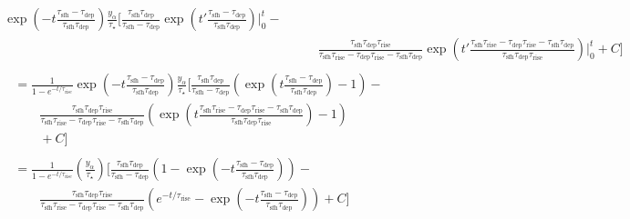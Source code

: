 \documentclass[12pt]{article}
\newcommand{\timescale}[1]{\ensuremath{\tau_\text{#1}}}
\begin{document}
\begin{subequations}
\begin{align}
\begin{split}
\exp \left(-t\frac{
	\timescale{sfh} - \timescale{dep}
}{
	\timescale{sfh}\timescale{dep}
}\right) \frac{y_\alpha}{\tau_\star} \bigg[\frac{
	\timescale{sfh}\timescale{dep}
}{
	\timescale{sfh} - \timescale{dep}
} \exp \left(t' \frac{
	\timescale{sfh} - \timescale{dep}
}{
	\timescale{sfh}\timescale{dep}
}\right) \bigg|_0^t -
\\
&\qquad \frac{
	\timescale{sfh}\timescale{dep}\timescale{rise}
}{
	\timescale{sfh}\timescale{rise} - \timescale{dep}\timescale{rise} -
	\timescale{sfh}\timescale{dep}
} \exp\left(
t'\frac{
	\timescale{sfh}\timescale{rise} - \timescale{dep}\timescale{rise} -
	\timescale{sfh}\timescale{dep}
}{
	\timescale{sfh}\timescale{dep}\timescale{rise}
}
\right)\bigg|_0^t + C \bigg]
\end{split}
\\
\begin{split} %
&= \frac{1}{1 - e^{-t / \timescale{rise}}}
\exp \left(-t\frac{
	\timescale{sfh} - \timescale{dep}
}{
	\timescale{sfh}\timescale{dep}
}\right) \frac{y_\alpha}{\tau_\star} \bigg[\frac{
	\timescale{sfh}\timescale{dep}
}{
	\timescale{sfh} - \timescale{dep}
} \left(
\exp\left(
t\frac{
	\timescale{sfh} - \timescale{dep}
}{
	\timescale{sfh}\timescale{dep}
}\right) - 1\right) -
\\
&\qquad \frac{
	\timescale{sfh}\timescale{dep}\timescale{rise}
}{
	\timescale{sfh}\timescale{rise} - \timescale{dep}\timescale{rise} -
	\timescale{sfh}\timescale{dep}
} \left(
\exp\left(t\frac{
	\timescale{sfh}\timescale{rise} - \timescale{dep}\timescale{rise} -
	\timescale{sfh}\timescale{dep}
}{
	\timescale{sfh}\timescale{dep}\timescale{rise}
}\right) - 1\right)
\\
&\qquad + C\bigg]
\end{split}
\\
\begin{split} %
&= \frac{1}{1 - e^{-t / \timescale{rise}}}
\left(\frac{y_\alpha}{\tau_\star}\right)
\bigg[\frac{
	\timescale{sfh}\timescale{dep}
}{
	\timescale{sfh} - \timescale{dep}
} \left(
1 - \exp\left(-t\frac{
	\timescale{sfh} - \timescale{dep}
}{
	\timescale{sfh}\timescale{dep}
}\right)
\right) -
\\
&\qquad \frac{
	\timescale{sfh}\timescale{dep}\timescale{rise}
}{
	\timescale{sfh}\timescale{rise} - \timescale{dep}\timescale{rise} -
	\timescale{sfh}\timescale{dep}
} \left(e^{-t / \timescale{rise}} -
\exp\left(-t
\frac{
	\timescale{sfh} - \timescale{dep}
}{
	\timescale{sfh}\timescale{dep}
}
\right)
\right) + C\bigg]
\end{split}
\\

\end{align}
\end{subequations}
\end{document}
